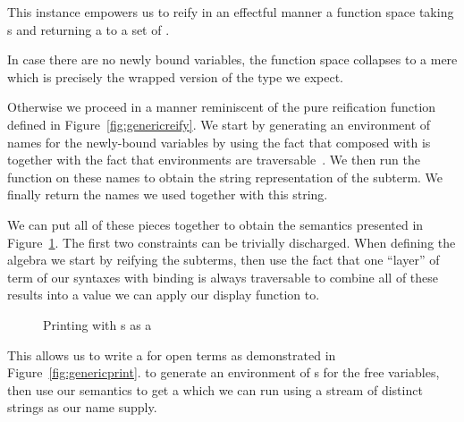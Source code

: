 This  instance empowers us to reify in an effectful manner
a  function space taking s and returning a 
to a set of .

\begin{agdasnippet}
\end{agdasnippet}

In case there are no newly bound variables, the  function space
collapses to a mere  which is precisely the wrapped version of
the type we expect.

\begin{agdasnippet}
\end{agdasnippet}

Otherwise we proceed in a manner reminiscent of the pure reification function
defined in Figure~\ref{fig:genericreify}. We start by generating an environment
of names for the newly-bound variables by using the fact that  composed
with  is  together with the fact that environments are
traversable~\cite{mcbride_paterson_2008}. We then run the  function
on these names to obtain the string representation of the subterm. We finally
return the names we used together with this string.

\begin{agdasnippet}
\end{agdasnippet}

We can put all of these pieces together to obtain the  semantics
presented in Figure~\ref{fig:genericprinting}.
The first two constraints can be trivially discharged. When defining the
algebra we start by reifying the subterms, then use the fact that  one ``layer''
of term of our syntaxes with binding is always traversable to combine all of
these results into a value we can apply our display function to.

\begin{figure}[h]
\caption{Printing with s as a }\label{fig:genericprinting}
\end{figure}

This allows us to write a  for open terms as demonstrated in
Figure~\ref{fig:genericprint}.
to generate an environment of s for the free variables, then use
our semantics to get a  which we can run using a stream  of distinct
strings as our name supply.

